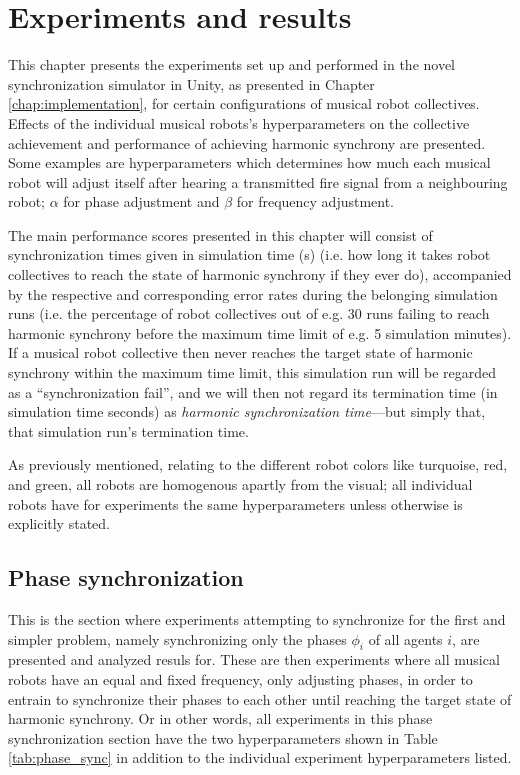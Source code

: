 \chapter{Experiments and results}
\label{chap:experiments_and_results}

This chapter presents the experiments set up and performed in the novel synchronization simulator in Unity, as presented in Chapter \ref{chap:implementation}, for certain configurations of musical robot collectives. Effects of the individual musical robots's hyperparameters on the collective achievement and performance of achieving harmonic synchrony are presented. Some examples are hyperparameters which determines how much each musical robot will adjust itself after hearing a transmitted fire signal from a neighbouring robot; $\alpha$ for phase adjustment and $\beta$ for frequency adjustment.

The main performance scores presented in this chapter will consist of synchronization times given in simulation time (s) (i.e. how long it takes robot collectives to reach the state of harmonic synchrony if they ever do), accompanied by the respective and corresponding error rates during the belonging simulation runs (i.e. the percentage of robot collectives out of e.g. 30 runs failing to reach harmonic synchrony before the maximum time limit of e.g. 5 simulation minutes). If a musical robot collective then never reaches the target state of harmonic synchrony within the maximum time limit, this simulation run will be regarded as a ``synchronization fail'', and we will then not regard its termination time (in simulation time seconds) as \textit{harmonic synchronization time}—but simply that, that simulation run's termination time.

As previously mentioned, relating to the different robot colors like turquoise, red, and green, all robots are homogenous apartly from the visual; all individual robots have for experiments the same hyperparameters unless otherwise is explicitly stated.


\section{Phase synchronization}
\label{sec:phase_sync}
This is the section where experiments attempting to synchronize for the first and simpler problem, namely synchronizing only the phases $\phi_i$ of all agents $i$, are presented and analyzed resuls for. These are then experiments where all musical robots have an equal and fixed frequency, only adjusting phases, in order to entrain to synchronize their phases to each other until reaching the target state of harmonic synchrony. Or in other words, all experiments in this phase synchronization section have the two hyperparameters shown in Table \ref{tab:phase_sync} in addition to the individual experiment hyperparameters listed.

